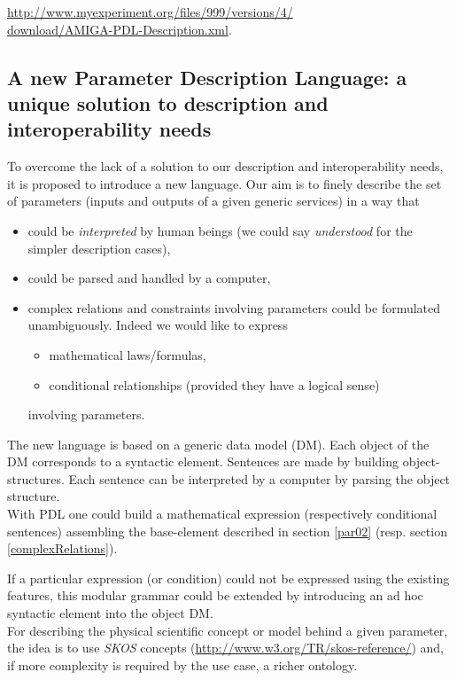 \documentclass[a4paper,11pt] {ivoa}
\begin{document}
\href{
http://www.myexperiment.org/files/999/versions/4/download/AMIGA-PDL-Description.xml
}{http://www.myexperiment.org/files/999/versions/4/\\download/AMIGA-PDL-Description.xml}.

\subsection{A new Parameter Description Language: a unique solution to description and interoperability needs}
To overcome the lack of a solution to our description and interoperability
needs, it is proposed to introduce a new language.
Our aim is to finely describe the set of parameters (inputs and outputs of a given generic services)
in a way that
\begin{itemize}
\item could be {\it interpreted} by human beings (we could say {\it understood} for the simpler description cases),
\item could be parsed and handled by a computer,
\item complex relations and constraints involving parameters could be formulated unambiguously.
Indeed we would like to express
\begin{itemize}
\item mathematical laws/formulas,
\item conditional relationships (provided they have a logical sense)
\end{itemize}
involving parameters.
\end{itemize}
The new language is based on a generic data model (DM). Each object of the DM corresponds to a
syntactic element. Sentences are made by building object-structures.
Each sentence can be interpreted by a computer by parsing the object structure.\\

With PDL one could build a mathematical expression (respectively conditional sentences) assembling the base-element described in section \ref{par02} (resp. section \ref{complexRelations}). 

If a particular expression (or condition) could not be expressed using the existing features,
this modular grammar could be extended by introducing an ad hoc syntactic element into the object DM. \\

For describing the physical scientific concept or model behind a given parameter, the idea is to use
{\it SKOS} concepts
(\href{http://www.w3.org/TR/skos-reference/}{http://www.w3.org/TR/skos-reference/}) and, if more complexity is required by the use case, a richer ontology.\\
\end{document}
